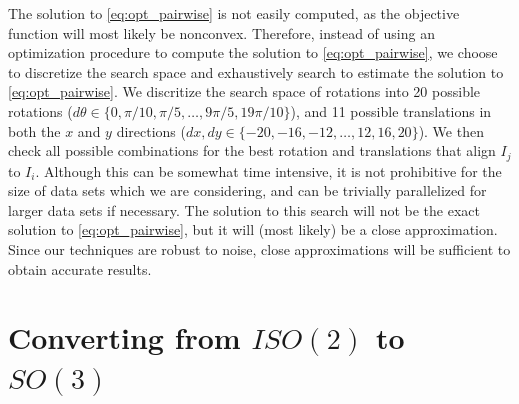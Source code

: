\documentclass[11pt]{article}
\begin{document}
The solution to \eqref{eq:opt_pairwise} is not easily computed, as the objective function will most likely be nonconvex.
%
Therefore, instead of using an optimization procedure to compute the solution to \eqref{eq:opt_pairwise}, we choose to discretize the search space and exhaustively search to estimate the solution to \eqref{eq:opt_pairwise}.
%
We discritize the search space of rotations into 20 possible rotations ($d\theta  \in \{0, \pi/10, \pi/5, \dots, 9 \pi/5, 19\pi/10 \}$), and 11 possible translations in both the $x$ and $y$ directions ($dx, dy \in \{-20, -16, -12, \dots, 12, 16, 20 \}$). 
%
We then check all possible combinations for the best rotation and translations that align $I_j$ to $I_i$. 
%
Although this can be somewhat time intensive, it is not prohibitive for the size of data sets which we are considering, and can be trivially parallelized for larger data sets if necessary.
%
The solution to this search will not be the exact solution to \eqref{eq:opt_pairwise}, but it will (most likely) be a close approximation.
%
Since our techniques are robust to noise, close approximations will be sufficient to obtain accurate results.

\section{Converting from $ISO(2)$ to $SO(3)$}
\end{document}
